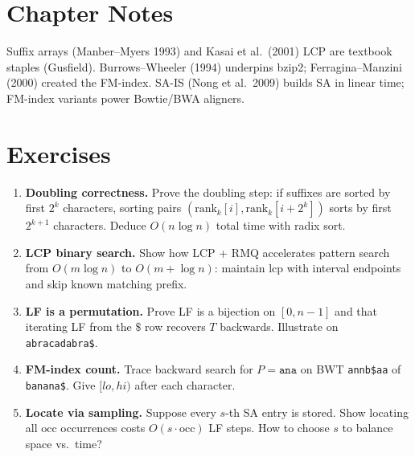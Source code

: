 \section{Chapter Notes}
Suffix arrays (Manber--Myers 1993) and Kasai et al.\ (2001) LCP are textbook staples (Gusfield). Burrows--Wheeler (1994) underpins bzip2; Ferragina--Manzini (2000) created the FM-index. SA-IS (Nong et al.\ 2009) builds SA in linear time; FM-index variants power Bowtie/BWA aligners.

\section{Exercises}
\label{sec:ch06-exercises}
\begin{enumerate}[label=E6.\arabic*, leftmargin=*, itemsep=0.7em]
    \item \textbf{Doubling correctness.} Prove the doubling step: if suffixes are sorted by first $2^k$ characters, sorting pairs $(\text{rank}_k[i],\text{rank}_k[i+2^k])$ sorts by first $2^{k+1}$ characters. Deduce $O(n\log n)$ total time with radix sort.
    \item \textbf{LCP binary search.} Show how LCP + RMQ accelerates pattern search from $O(m\log n)$ to $O(m+\log n)$: maintain lcp with interval endpoints and skip known matching prefix.
    \item \textbf{LF is a permutation.} Prove LF is a bijection on $[0,n-1]$ and that iterating LF from the $\$$ row recovers $T$ backwards. Illustrate on \texttt{abracadabra\$}.
    \item \textbf{FM-index count.} Trace backward search for $P=\texttt{ana}$ on BWT \texttt{annb\$aa} of \texttt{banana\$}. Give $[lo,hi)$ after each character.
    \item \textbf{Locate via sampling.} Suppose every $s$-th SA entry is stored. Show locating all $\text{occ}$ occurrences costs $O(s\cdot\text{occ})$ LF steps. How to choose $s$ to balance space vs.\ time?
\end{enumerate}
